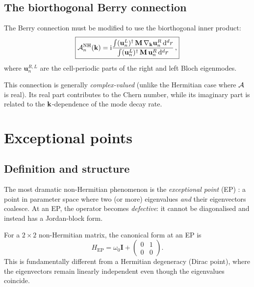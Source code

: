 \subsection{The biorthogonal Berry connection}
\label{sec:ch17-biorthogonal-berry}

The Berry connection must be modified to use the biorthogonal inner
product:
\begin{equation}\label{eq:ch17-nh-berry}
  \boxed{%
  \Aberry_n^{\mathrm{NH}}(\kvec)
  = \ii\frac{\int(\mathbf{u}_n^L)^\dagger\,\Mmat\,
  \nabla_\kvec\mathbf{u}_n^R\,\dd^d r}
  {\int(\mathbf{u}_n^L)^\dagger\,\Mmat\,\mathbf{u}_n^R\,\dd^d r}\,,}
\end{equation}
where $\mathbf{u}_n^{R,L}$ are the cell-periodic parts of the right
and left Bloch eigenmodes.

This connection is generally \emph{complex-valued} (unlike the
Hermitian case where $\mathcal{A}$ is real).  Its real part contributes to
the Chern number, while its imaginary part is related to the
$\mathbf{k}$-dependence of the mode decay rate.

\section{Exceptional points}
\label{sec:ch17-ep}

\subsection{Definition and structure}
\label{sec:ch17-ep-def}

The most dramatic non-Hermitian phenomenon is the \emph{exceptional
point} (EP) \cite{ozawa2018topological}: a point in parameter space where two (or more)
eigenvalues \emph{and} their eigenvectors coalesce.  At an EP, the
operator becomes \emph{defective}: it cannot be diagonalised and
instead has a Jordan-block form.

For a $2\times 2$ non-Hermitian matrix, the canonical form at an EP is
\begin{equation}\label{eq:ch17-ep-jordan}
  H_{\mathrm{EP}} = \omega_0\mathbf{I} + \begin{pmatrix}
    0 & 1 \\ 0 & 0
  \end{pmatrix}.
\end{equation}
This is fundamentally different from a Hermitian degeneracy (Dirac
point), where the eigenvectors remain linearly independent even though
the eigenvalues coincide.

